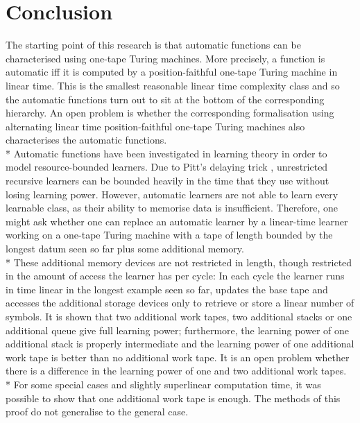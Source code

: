 \documentclass{LMCS}
\theoremstyle{plain}\newtheorem{athm}[thm]{Theorem}
\theoremstyle{plain}\newtheorem{aprop}[thm]{Proposition}
\theoremstyle{plain}\newtheorem{aprob}[thm]{Open Problem}
\theoremstyle{plain}\newtheorem{acor}[thm]{Corollary}
\theoremstyle{plain}\newtheorem{alem}[thm]{Lemma}
\theoremstyle{definition}\newtheorem{adefn}[thm]{Definition}
\theoremstyle{definition}\newtheorem{arem}[thm]{Remark}
\theoremstyle{plain}\newtheorem{aexmp}[thm]{Example}
\theoremstyle{plain}\newtheorem{aclm}[thm]{Claim}
\def\sp{\\*\indent}
\begin{document}
\section{Conclusion}

\noindent
The starting point of this research is that automatic functions can be
characterised using one-tape Turing machines. More precisely, a function
is automatic iff it is computed by a position-faithful one-tape Turing
machine in linear time. This is the smallest reasonable linear time
complexity class and so the automatic functions turn out to sit at the
bottom of the corresponding hierarchy. An open problem is whether the
corresponding formalisation using alternating linear time position-faithful
one-tape Turing machines also characterises the automatic functions.
\sp
Automatic functions have been investigated in learning theory in order
to model resource-bounded learners. Due to Pitt's delaying trick \cite{Pi89},
unrestricted recursive learners can be bounded heavily in the time
that they use without
losing learning power. However,
automatic learners are not able to learn every learnable class, as their
ability to memorise data is insufficient. Therefore, one might ask
whether one can replace an automatic learner by a linear-time learner
working on a one-tape Turing machine with a tape of length bounded
by the longest datum seen so far plus some additional memory.
\sp
These additional memory devices are not restricted in length, 
though restricted in
the amount of access the learner has per cycle: In each cycle the learner
runs in time linear in the longest example seen so far, updates the
base tape and accesses the additional storage devices only to retrieve
or store a linear number of symbols. It is shown that two additional work
tapes, two additional stacks or one additional queue give full learning
power; furthermore, the learning power of one additional stack is properly
intermediate and the learning power of one additional work tape is better
than no additional work tape. It is an open problem whether there is a
difference in the learning power of one and two additional work tapes.
\sp
For some special cases and slightly superlinear computation time, it
was possible to show that one additional work tape is enough. The methods
of this proof do not generalise to the general case.
\end{document}

